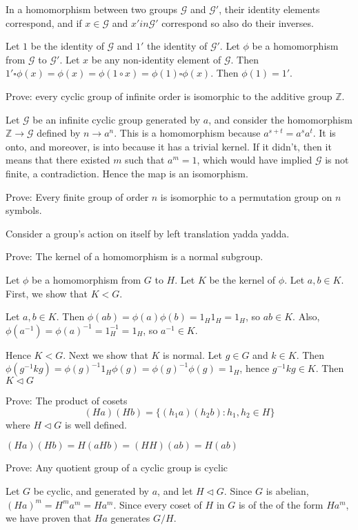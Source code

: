 \exercise
In a homomorphism between two groups $\mathcal{G}$ and $\mathcal{G}'$, their identity elements correspond, and if $x \in \mathcal{G}$ and $x' in \mathcal{G}'$ correspond so also do their inverses.

\answer
Let $1$ be the identity of $\mathcal{G}$ and $1'$ the identity of $\mathcal{G}'$. Let $\phi$ be a homomorphism from $\mathcal{G}$ to $\mathcal{G}'$. Let $x$ be any non-identity element of $\mathcal{G}$. Then $1' \square \phi(x) = \phi(x) = \phi(1 \circ x) = \phi(1) \square \phi(x)$. Then $\phi(1) = 1'$.

\exercise
Prove: every cyclic group of infinite order is isomorphic to the additive group $\mathbb{Z}$.

\answer
Let $\mathcal{G}$ be an infinite cyclic group generated by $a$, and consider the homomorphism $\mathbb{Z} \to \mathcal{G}$ defined by $n \to a^n$. This is a homomorphism because $a^{s+t} = a^s a^t$. It is onto, and moreover, is into because it has a trivial kernel. If it didn't, then it means that there existed $m$ such that $a^m = 1$, which would have implied $\mathcal{G}$ is not finite, a contradiction. Hence the map is an isomorphism.


\exercise
Prove: Every finite group of order $n$ is isomorphic to a permutation group on $n$ symbols.

\answer
Consider a group's action on itself by left translation yadda yadda.


\exercise
Prove: The kernel of a homomorphism is a normal subgroup.

\answer
Let $\phi$ be a homomorphism from $G$ to $H$. Let $K$ be the kernel of $\phi$. Let $a, b \in K$. First, we show that $K < G$.

Let $a, b \in K$. Then $\phi(ab) = \phi(a)\phi(b) = 1_H 1_H = 1_H$, so $ab \in K$. Also, $\phi(a^{-1}) = \phi(a)^{-1} = 1_H^{-1} = 1_H$, so $a^{-1} \in K$. 

Hence $K < G$. Next we show that $K$ is normal. Let $g \in G$ and $k \in K$. Then $\phi(g^{-1}kg) = \phi(g)^{-1} 1_H \phi(g) = \phi(g)^{-1} \phi(g) = 1_H$, hence $g^{-1}kg \in K$. Then $K \triangleleft G$


\exercise
Prove: The product of cosets 
\[(Ha)(Hb) = \{(h_1a)(h_2b): h_1,h_2 \in H\}\]
where $H \triangleleft G$ is well defined.

\answer
$(Ha)(Hb) = H(aHb) = (HH)(ab) = H(ab)$


\exercise
Prove: Any quotient group of a cyclic group is cyclic

\answer
Let $G$ be cyclic, and generated by $a$, and let $H \triangleleft G$. Since $G$ is abelian, $(Ha)^m = H^m a^m = Ha^m$. Since every coset of $H$ in $G$ is of the of the form $Ha^m$, we have proven that $Ha$ generates $G/H$.


